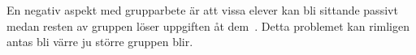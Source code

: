 

\textcolor{turkos} {
En negativ aspekt med grupparbete är att vissa elever kan bli sittande passivt medan resten av gruppen löser uppgiften åt dem~\cite{RikaProblem}. Detta problemet kan rimligen antas bli värre ju större gruppen blir. 
}












